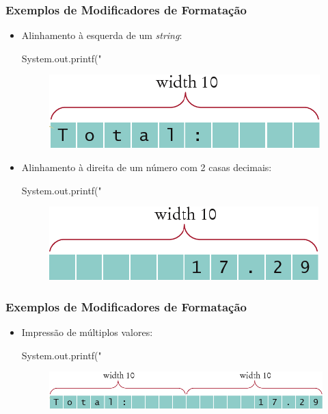 \documentclass[xcolor={dvipsnames,table},aspectratio=169]{beamer}
\begin{document}
\begin{frame}[fragile]\frametitle{Exemplos de Modificadores de Formatação}
\begin{itemize}
	\item Alinhamento à esquerda de um \emph{string}:
\begin{javacode}
System.out.printf("%
\end{javacode}
\begin{figure}[h]
	\includegraphics[height=0.14\paperheight,left]{pucrs-ep-fprog-unidade_02-tipos_de_dados_fundamentais-laminas-formatacao2.png}
\end{figure}
	\item Alinhamento à direita de um número com 2 casas decimais:
\begin{javacode}
System.out.printf("%
\end{javacode}
\begin{figure}[h]
	\includegraphics[height=0.14\paperheight,left]{pucrs-ep-fprog-unidade_02-tipos_de_dados_fundamentais-laminas-formatacao3.png}
\end{figure}
\end{itemize}
\end{frame}

\begin{frame}[fragile]\frametitle{Exemplos de Modificadores de Formatação}
\begin{itemize}
	\item Impressão de múltiplos valores:
\begin{javacode}
System.out.printf("%
\end{javacode}
\begin{figure}[h]
	\includegraphics[height=0.15\paperheight,left]{pucrs-ep-fprog-unidade_02-tipos_de_dados_fundamentais-laminas-formatacao1.png}
\end{figure}
\end{itemize}
\end{frame}
\end{document}
